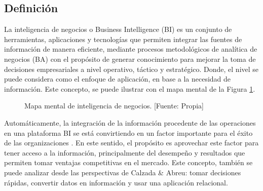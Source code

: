 \documentclass[11pt,titlepage]{report}
\begin{document}
\subsection{Definición}
La inteligencia de negocios o Business Intelligence (BI) es un conjunto de herramientas, aplicaciones y tecnologías que permiten integrar las fuentes de información de manera eficiente, mediante procesos metodológicos de analítica de negocios (BA) con el propósito de generar conocimiento para mejorar la toma de decisiones empresariales a nivel operativo, táctico y estratégico. Donde, el nivel se puede considera como el enfoque de aplicación, en base a la necesidad de información. Este concepto, se puede ilustrar con el mapa mental de la Figura \ref{fig: BI}. 
\begin{figure}[h]
\centering
{}
\caption{Mapa mental de inteligencia de negocios. [Fuente: Propia]} \label{fig: BI}	
\end{figure}

Automáticamente, la integración de la información procedente de las operaciones en una plataforma BI se está convirtiendo en un factor importante para el éxito de las organizaciones \cite{gui01}. En este sentido, el propósito es aprovechar este factor para tener acceso a la información, principalmente del desempeño y resultados que permiten tomar ventajas competitivas en el mercado. Este concepto, también se puede analizar desde las perspectivas de Calzada \& Abreu: tomar decisiones rápidas, convertir datos en información y usar una aplicación relacional.\\
\end{document}
